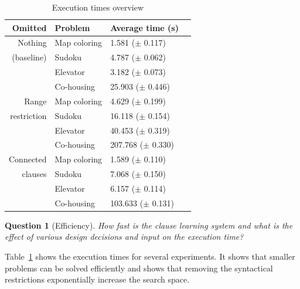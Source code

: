 \documentclass[letterpaper]{article}
\newtheorem{question}{Question}
\theoremstyle{definition}
\begin{document}
\begin{table}
  \caption{Execution times overview}
  \begin{tabularx}{\linewidth}{rl|ll}

\textbf{Omitted}  & \textbf{Problem}    & \textbf{Average time (s)} \\ %
\toprule
Nothing           & Map coloring        & 1.581   ($\pm$ 0.117)     \\ %
   (baseline)     & Sudoku              & 4.787   ($\pm$ 0.062)     \\ %
                  & Elevator            & 3.182   ($\pm$ 0.073)     \\ %
                  & Co-housing          & 25.903  ($\pm$ 0.446)     \\ %
\midrule
Range             & Map coloring        & 4.629   ($\pm$ 0.199)     \\ %
restriction       & Sudoku              & 16.118  ($\pm$ 0.154)     \\ %
                  & Elevator            & 40.453  ($\pm$ 0.319)     \\ %
                  & Co-housing          & 207.768 ($\pm$ 0.330)     \\ %
\midrule
Connected         & Map coloring        & 1.589   ($\pm$ 0.110)     \\ %
    clauses       & Sudoku              & 7.068   ($\pm$ 0.150)     \\ %
                  & Elevator            & 6.157   ($\pm$ 0.114)     \\ %
                  & Co-housing          & 103.633 ($\pm$ 0.131)     \\ %
  \end{tabularx}
  \label{tbl:uitvoering}
\end{table}

\begin{question}[Efficiency]
  How fast is the clause learning system and what is the effect of various design decisions and input on the execution time?
\end{question}

Table~\ref{tbl:uitvoering} shows the execution times for several experiments.
It shows that smaller problems can be solved efficiently and shows that removing the syntactical restrictions exponentially increase the search space.
\end{document}
